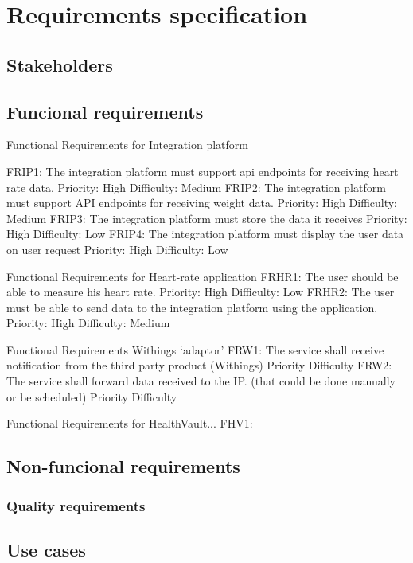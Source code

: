 \chapter{Requirements specification}
\label{Requirements}

\section{Stakeholders}

\section{Funcional requirements}

Functional Requirements for Integration platform

FRIP1: The integration platform must support api endpoints for receiving heart rate data.
Priority: High
Difficulty: Medium
FRIP2: The integration platform must support API endpoints for receiving weight data.
Priority: High
Difficulty: Medium
FRIP3: The integration platform must store the data it receives
Priority: High
Difficulty: Low
FRIP4: The integration platform must display the user data on user request
Priority: High
Difficulty: Low

Functional Requirements for Heart-rate application
FRHR1: The user should be able to measure his heart rate.
Priority: High Difficulty: Low
FRHR2: The user must be able to send data to the integration platform using the application.
Priority: High Difficulty: Medium

Functional Requirements Withings ‘adaptor’
FRW1: The service shall receive notification from the third party product (Withings)
Priority
Difficulty
FRW2: The service shall forward data received to the IP. (that could be done manually or be scheduled)
Priority
Difficulty

Functional Requirements for HealthVault...
FHV1:



\section{Non-funcional requirements}

\subsection{Quality requirements}


\section{Use cases}


